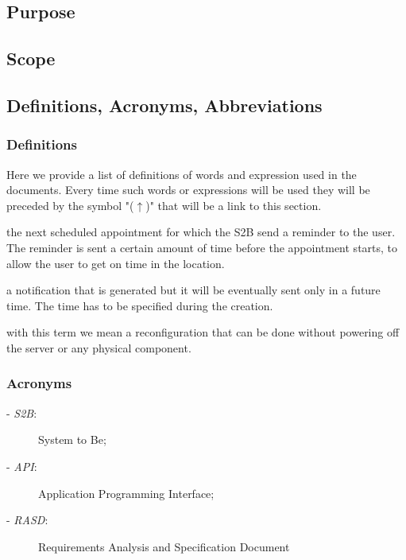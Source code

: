 \subsection{Purpose}
	
\subsection{Scope}
	
\subsection{Definitions, Acronyms, Abbreviations}
	\subsubsection{Definitions}
	\label{definitions}
	Here we provide a list of definitions of words and expression used in the documents. Every time such words or expressions will be used they will be preceded by the symbol "($\uparrow$)" that will be a link to this section.
	\begin{description}[before={\renewcommand{\makelabel}[1]{-- \textbf{\textit{##1}}:}}]
		\item[Incoming Appointment] the next scheduled appointment for which the S2B send a reminder to the user. The reminder is sent  a certain amount of time before the appointment starts, to allow the user to get on time in the location.
		\item[Future Notification] a notification that is generated but it will be eventually sent only in a future time. The time has to be specified during the creation.
		\item[Dynamic Configuration] with this term we mean a reconfiguration that can be done without powering off the server or any physical component.
	\end{description}
	\subsubsection{Acronyms}
			\begin{description}
		\item[- \textit{S2B}:] System to Be;
		\item[- \textit{API}:] Application Programming Interface;
		\item[- \textit{RASD}:] Requirements Analysis and Specification Document
	\end{description}
	
